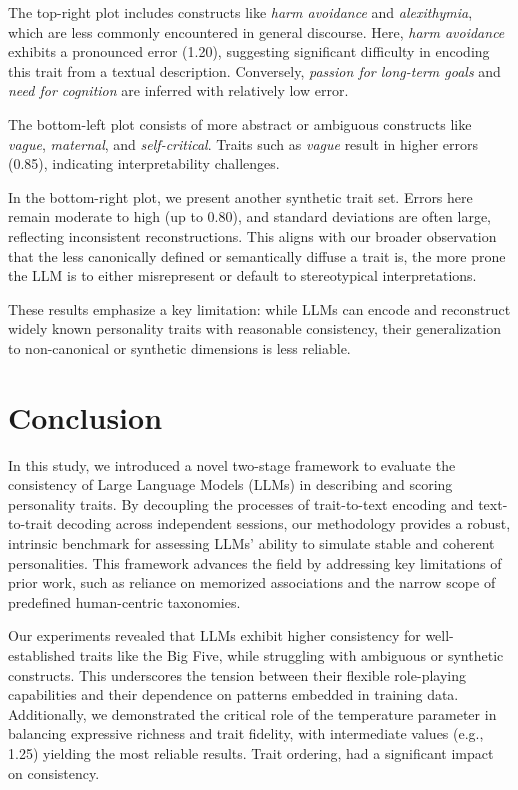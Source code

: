 \documentclass[12pt]{article}
\begin{document}
The top-right plot includes constructs like \textit{harm avoidance} and \textit{alexithymia}, which are less commonly encountered in general discourse. Here, \textit{harm avoidance} exhibits a pronounced error (1.20), suggesting significant difficulty in encoding this trait from a textual description. Conversely, \textit{passion for long-term goals} and \textit{need for cognition} are inferred with relatively low error.

The bottom-left plot consists of more abstract or ambiguous constructs like \textit{vague}, \textit{maternal}, and \textit{self-critical}. Traits such as \textit{vague} result in higher errors (0.85), indicating interpretability challenges.

In the bottom-right plot, we present another synthetic trait set. Errors here remain moderate to high (up to 0.80), and standard deviations are often large, reflecting inconsistent reconstructions. This aligns with our broader observation that the less canonically defined or semantically diffuse a trait is, the more prone the LLM is to either misrepresent or default to stereotypical interpretations.

These results emphasize a key limitation: while LLMs can encode and reconstruct widely known personality traits with reasonable consistency, their generalization to non-canonical or synthetic dimensions is less reliable.

\section{Conclusion}

In this study, we introduced a novel two-stage framework to evaluate the consistency of Large Language Models (LLMs) in describing and scoring personality traits. By decoupling the processes of trait-to-text encoding and text-to-trait decoding across independent sessions, our methodology provides a robust, intrinsic benchmark for assessing LLMs' ability to simulate stable and coherent personalities. This framework advances the field by addressing key limitations of prior work, such as reliance on memorized associations and the narrow scope of predefined human-centric taxonomies.  

Our experiments revealed that LLMs exhibit higher consistency for well-established traits like the Big Five, while struggling with ambiguous or synthetic constructs. This underscores the tension between their flexible role-playing capabilities and their dependence on patterns embedded in training data. Additionally, we demonstrated the critical role of the temperature parameter in balancing expressive richness and trait fidelity, with intermediate values (e.g., 1.25) yielding the most reliable results. Trait ordering, had a significant impact on consistency.  
\end{document}
